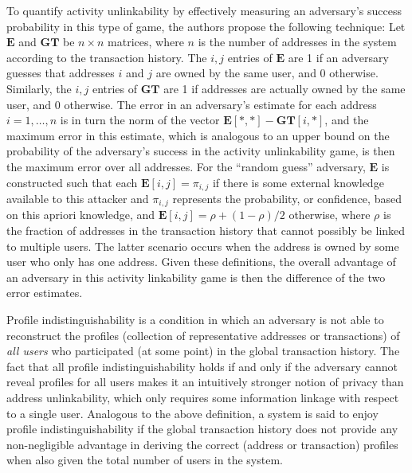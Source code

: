 To quantify activity unlinkability by effectively measuring an adversary's success probability in this type of game, the authors propose the following technique: Let $\mathbf{E}$ and $\mathbf{GT}$ be  $n \times n$ matrices, where $n$ is the number of addresses in the system according to the transaction history. The $i,j$ entries of $\mathbf{E}$ are 1 if an adversary guesses that addresses $i$ and $j$ are owned by the same user, and $0$ otherwise. Similarly, the $i,j$ entries of $\mathbf{GT}$ are 1 if addresses are actually owned by the same user, and 0 otherwise. The error in an adversary's estimate for each address $i = 1,\dots,n$ is in turn the norm of the vector $\mathbf{E}[*,*] - \mathbf{GT}[i,*]$, and the maximum error in this estimate, which is analogous to an upper bound on the probability of the adversary's success in the activity unlinkability game, is then the maximum error over all addresses. For the ``random guess'' adversary, $\mathbf{E}$ is constructed such that each $\mathbf{E}[i,j] = \pi_{i,j}$ if there is some external knowledge available to this attacker and $\pi_{i,j}$ represents the probability, or confidence, based on this apriori knowledge, and $\mathbf{E}[i,j] = \rho + (1 - \rho)/2$ otherwise, where $\rho$ is the fraction of addresses in the transaction history that cannot possibly be linked to multiple users. The latter scenario occurs when the address is owned by some user who only has one address. Given these definitions, the overall advantage of an adversary in this activity linkability game is then the difference of the two error estimates. 

Profile indistinguishability is a condition in which an adversary is not able to reconstruct the profiles (collection of representative addresses or transactions) of \emph{all users} who participated (at some point) in the global transaction history. The fact that all profile indistinguishability holds if and only if the adversary cannot reveal profiles for all users makes it an intuitively stronger notion of privacy than address unlinkability, which only requires some information linkage with respect to a single user. Analogous to the above definition, a system is said to enjoy profile indistinguishability if the global transaction history does not provide any non-negligible advantage in deriving the correct (address or transaction) profiles when also given the total number of users in the system. 

